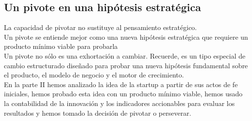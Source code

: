 \documentclass[10pt]{article}
\begin{document}
\begin{multicols}{2}
\subsection*{Un pivote en una hipótesis estratégica}
La capacidad de pivotar no sustituye al pensamiento estratégico. \\
{\color{blue}Un pivote se entiende mejor como una nueva hipótesis estratégica que requiere un producto mínimo viable para probarla}\\
Un pivote no sólo es una exhortación a cambiar. Recuerde, es un tipo especial de cambio estructurado diseñado para probar una nueva hipótesis fundamental sobre el producto, el modelo de negocio y el motor de crecimiento. \\
{\color{red}En la parte II hemos analizado la idea de la startup a partir de sus actos de fe iniciales, hemos probado esta idea con un producto mínimo viable, hemos usado la contabilidad de la innovación y los indicadores accionables para evaluar los resultados y hemos tomado la decisión de pivotar o perseverar.}
\end{multicols}
\end{document}

